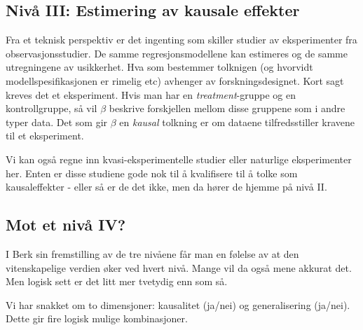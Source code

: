 \documentclass[
  letterpaper,
  DIV=11,
  numbers=noendperiod]{scrreprt}
\theoremstyle{definition}
\theoremstyle{remark}
\begin{document}
\hypertarget{nivuxe5-iii-estimering-av-kausale-effekter}{%
\subsection{Nivå III: Estimering av kausale
effekter}\label{nivuxe5-iii-estimering-av-kausale-effekter}}

Fra et teknisk perspektiv er det ingenting som skiller studier av
eksperimenter fra observasjonsstudier. De samme regresjonsmodellene kan
estimeres og de samme utregningene av usikkerhet. Hva som bestemmer
tolknigen (og hvorvidt modellspesifikasjonen er rimelig etc) avhenger av
forskningsdesignet. Kort sagt kreves det et eksperiment. Hvis man har en
\emph{treatment}-gruppe og en kontrollgruppe, så vil \(\beta\) beskrive
forskjellen mellom disse gruppene som i andre typer data. Det som gir
\(\beta\) en \emph{kausal} tolkning er om dataene tilfredsstiller
kravene til et eksperiment.

Vi kan også regne inn kvasi-eksperimentelle studier eller naturlige
eksperimenter her. Enten er disse studiene gode nok til å kvalifisere
til å tolke som kausaleffekter - eller så er de det ikke, men da hører
de hjemme på nivå II.

\hypertarget{mot-et-nivuxe5-iv}{%
\subsection{Mot et nivå IV?}\label{mot-et-nivuxe5-iv}}

I Berk sin fremstilling av de tre nivåene får man en følelse av at den
vitenskapelige verdien øker ved hvert nivå. Mange vil da også mene
akkurat det. Men logisk sett er det litt mer tvetydig enn som så.

Vi har snakket om to dimensjoner: kausalitet (ja/nei) og generalisering
(ja/nei). Dette gir fire logisk mulige kombinasjoner.
\end{document}
